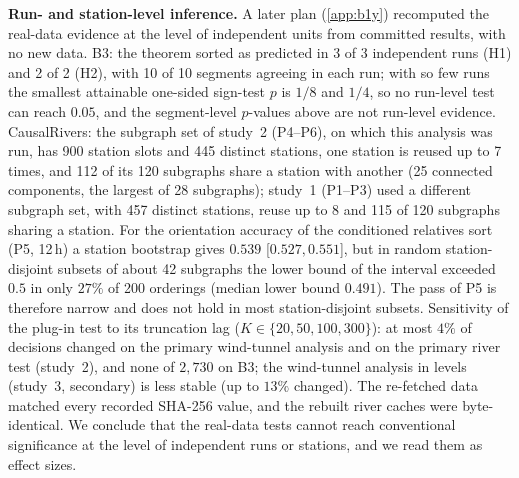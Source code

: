 \documentclass[pdflatex,sn-apa]{sn-jnl}
\theoremstyle{thmstyleone}
\theoremstyle{thmstylethree}
\theoremstyle{thmstyletwo}
\begin{document}
\textbf{Run- and station-level inference.} A later plan (\cref{app:b1y})
recomputed the real-data evidence at the level of independent units from
committed results, with no new data. B3: the theorem sorted as predicted in 3
of 3 independent runs (H1) and 2 of 2 (H2), with 10 of 10 segments agreeing in
each run; with so few runs the smallest attainable one-sided sign-test $p$ is
$1/8$ and $1/4$, so no run-level test can reach $0.05$, and the segment-level
$p$-values above are not run-level evidence. CausalRivers: the subgraph set of
study~2 (P4--P6), on which this analysis was run, has 900 station slots and 445 distinct stations, one station is
reused up to 7 times, and 112 of its 120 subgraphs share a station with another
(25 connected components, the largest of 28 subgraphs); study~1 (P1--P3) used a
different subgraph set, with 457 distinct stations, reuse up to 8 and 115 of 120
subgraphs sharing a station. For the orientation accuracy of the
conditioned relatives sort (P5, 12\,h) a station bootstrap gives $0.539$
[$0.527,0.551$], but in random station-disjoint subsets of about 42 subgraphs
the lower bound of the interval exceeded $0.5$ in only $27\%$ of 200 orderings
(median lower bound $0.491$). The pass of P5 is therefore narrow and does not
hold in most station-disjoint subsets. Sensitivity of the plug-in test to its
truncation lag ($K\in\{20,50,100,300\}$): at most $4\%$ of decisions changed on
the primary wind-tunnel analysis and on the primary river test (study~2), and none of $2{,}730$ on
B3; the wind-tunnel analysis in levels (study~3, secondary) is less stable (up to $13\%$ changed). The
re-fetched data matched every recorded SHA-256 value, and the rebuilt river
caches were byte-identical. We conclude that the real-data tests cannot reach
conventional significance at the level of independent runs or stations, and we
read them as effect sizes.
\end{document}
